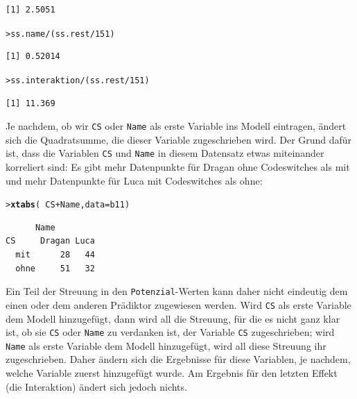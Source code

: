 \documentclass[oneside, 10pt]{book}\usepackage[]{graphicx}\usepackage[]{xcolor}
\makeatletter
\newcommand{\hlnum}[1]{\textcolor[rgb]{0.686,0.059,0.569}{#1}}%
\newcommand{\hlopt}[1]{\textcolor[rgb]{0,0,0}{#1}}%
\newcommand{\hlstd}[1]{\textcolor[rgb]{0.345,0.345,0.345}{#1}}%
\newcommand{\hlkwc}[1]{\textcolor[rgb]{0.333,0.667,0.333}{#1}}%
\newcommand{\hlkwd}[1]{\textcolor[rgb]{0.737,0.353,0.396}{\textbf{#1}}}%
\newenvironment{kframe}{%
 \def\at@end@of@kframe{}%
 \ifinner\ifhmode%
  \def\at@end@of@kframe{\end{minipage}}%
  \begin{minipage}{\columnwidth}%
 \fi\fi%
 \def\FrameCommand##1{\hskip\@totalleftmargin \hskip-\fboxsep
 \colorbox{shadecolor}{##1}\hskip-\fboxsep
     \hskip-\linewidth \hskip-\@totalleftmargin \hskip\columnwidth}%
 \MakeFramed {\advance\hsize-\width
   \@totalleftmargin\z@ \linewidth\hsize
   \@setminipage}}%
 {\par\unskip\endMakeFramed%
 \at@end@of@kframe}
\newenvironment{knitrout}{}{} %
\makeatother
\begin{document}
\begin{enumerate}
\begin{knitrout}
\begin{kframe}
\begin{verbatim}
[1] 2.5051
\end{verbatim}
\begin{alltt}
\hlstd{> }\hlstd{ss.name} \hlopt{/} \hlstd{(ss.rest}\hlopt{/}\hlnum{151}\hlstd{)}
\end{alltt}
\begin{verbatim}
[1] 0.52014
\end{verbatim}
\begin{alltt}
\hlstd{> }\hlstd{ss.interaktion} \hlopt{/} \hlstd{(ss.rest}\hlopt{/}\hlnum{151}\hlstd{)}
\end{alltt}
\begin{verbatim}
[1] 11.369
\end{verbatim}
\end{kframe}
\end{knitrout}
\end{enumerate}

Je nachdem, ob wir \texttt{CS} oder \texttt{Name} als erste Variable
ins Modell eintragen, ändert sich die Quadratsumme, die dieser
Variable zugeschrieben wird. Der Grund dafür ist, dass
die Variablen \texttt{CS} und \texttt{Name} in diesem Datensatz
etwas miteinander korreliert sind: Es gibt mehr Datenpunkte für
Dragan ohne Codeswitches als mit und mehr Datenpunkte für Luca
mit Codeswitches als ohne:
\begin{knitrout}
\color{fgcolor}\begin{kframe}
\begin{alltt}
\hlstd{> }\hlkwd{xtabs}\hlstd{(}\hlopt{~} \hlstd{CS} \hlopt{+} \hlstd{Name,} \hlkwc{data} \hlstd{= b11)}
\end{alltt}
\begin{verbatim}
      Name
CS     Dragan Luca
  mit      28   44
  ohne     51   32
\end{verbatim}
\end{kframe}
\end{knitrout}

Ein Teil der Streuung in den \texttt{Potenzial}-Werten
kann daher nicht eindeutig dem einen oder dem anderen
Prädiktor zugewiesen werden. Wird \texttt{CS} als erste
Variable dem Modell hinzugefügt, dann wird all die Streuung,
für die es nicht ganz klar ist, ob sie \texttt{CS}
oder \texttt{Name} zu verdanken ist,
der Variable \texttt{CS} zugeschrieben; wird \texttt{Name}
als erste Variable dem Modell hinzugefügt, wird all diese
Streuung ihr zugeschrieben. Daher ändern sich die Ergebnisse
für diese Variablen, je nachdem, welche Variable zuerst hinzugefügt
wurde. Am Ergebnis für den letzten Effekt (die Interaktion) ändert
sich jedoch nichts.
\end{document}
